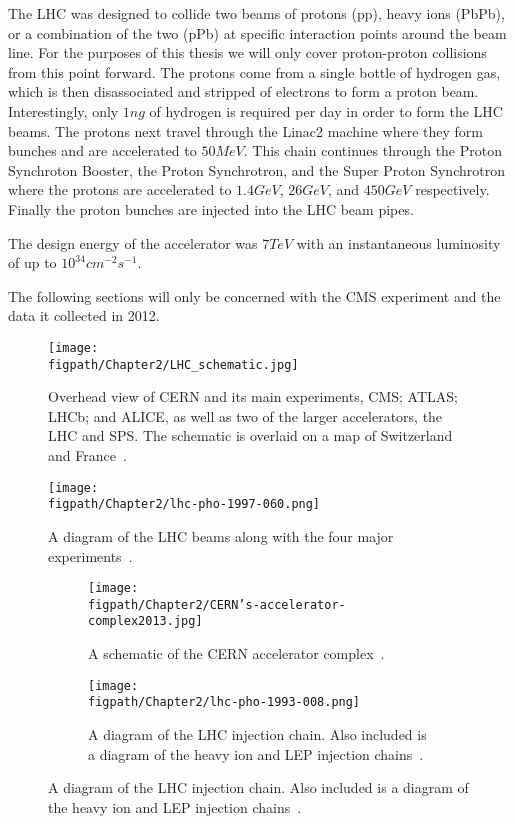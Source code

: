 The LHC was designed to collide two beams of protons (pp), heavy ions (PbPb), or a combination of the two (pPb) at specific interaction points around the beam line. For the purposes of this thesis we will only cover proton-proton collisions from this point forward. The protons come from a single bottle of hydrogen gas, which is then disassociated and stripped of electrons to form a proton beam. Interestingly, only $1\unit{ng}$ of hydrogen is required per day in order to form the LHC beams. The protons next travel through the Linac2 machine where they form bunches and are accelerated to $50\unit{MeV}$. This chain continues through the Proton Synchroton Booster, the Proton Synchrotron, and the Super Proton Synchrotron where the protons are accelerated to $1.4\unit{GeV}$, $26\unit{GeV}$, and $450\unit{GeV}$ respectively. Finally the proton bunches are injected into the LHC beam pipes.




The design energy of the accelerator was $7\unit{TeV}$ with an instantaneous luminosity of up to $10^{34}\unit{cm^{-2}s^{-1}}$.









The following sections will only be concerned with the CMS experiment and the data it collected in 2012.

\begin{figure}[tb]
	\centering
	\texttt{[image: \\figpath/Chapter2/LHC\_schematic.jpg]}
	\caption{Overhead view of CERN and its main experiments, CMS; ATLAS; LHCb; and ALICE, as well as two of the larger accelerators, the LHC and SPS. The schematic is overlaid on a map of Switzerland and France~\cite{LHC-schematic}.}
	\label{fig:LHC_schematic}
\end{figure}

\begin{figure}[tb]
	\centering
	\texttt{[image: \\figpath/Chapter2/lhc-pho-1997-060.png]}
	\caption{A diagram of the LHC beams along with the four major experiments~\cite{Jean-Luc:841573}.}
	\label{fig:LHC_beams}
\end{figure}

\begin{figure}[tb]
	\centering
	\begin{subfigure}[t]{0.4655\textwidth}
		\texttt{[image: \\figpath/Chapter2/CERN's-accelerator-complex2013.jpg]}
		\caption{A schematic of the CERN accelerator complex~\cite{Marcastel:1621583}.}
		\label{fig:CERN_accelerator_complex}
	\end{subfigure}
	\begin{subfigure}[t]{0.4655\textwidth}
		\texttt{[image: \\figpath/Chapter2/lhc-pho-1993-008.png]}
		\caption{A diagram of the LHC injection chain. Also included is a diagram of the heavy ion and LEP injection chains~\cite{Jean-Luc:841568}.}
		\label{fig:LHC_LEP_injection_complex}
	\end{subfigure}
\end{figure}

